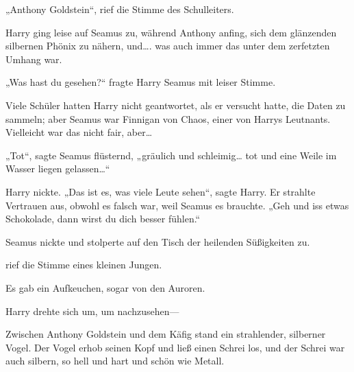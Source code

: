 „Anthony Goldstein“, rief die Stimme des Schulleiters.

Harry ging leise auf Seamus zu, während Anthony anfing, sich dem glänzenden silbernen Phönix zu nähern, und…. was auch immer das unter dem zerfetzten Umhang war.

„Was hast du gesehen?“ fragte Harry Seamus mit leiser Stimme.

Viele Schüler hatten Harry nicht geantwortet, als er versucht hatte, die Daten zu sammeln; aber Seamus war Finnigan von Chaos, einer von Harrys Leutnants. Vielleicht war das nicht fair, aber…

„Tot“, sagte Seamus flüsternd, „gräulich und schleimig… tot und eine Weile im Wasser liegen gelassen…“

Harry nickte. „Das ist es, was viele Leute sehen“, sagte Harry. Er strahlte Vertrauen aus, obwohl es falsch war, weil Seamus es brauchte. „Geh und iss etwas Schokolade, dann wirst du dich besser fühlen.“

Seamus nickte und stolperte auf den Tisch der heilenden Süßigkeiten zu.

 rief die Stimme eines kleinen Jungen.

Es gab ein Aufkeuchen, sogar von den Auroren.

Harry drehte sich um, um nachzusehen—

Zwischen Anthony Goldstein und dem Käfig stand ein strahlender, silberner Vogel. Der Vogel erhob seinen Kopf und ließ einen Schrei los, und der Schrei war auch silbern, so hell und hart und schön wie Metall.

